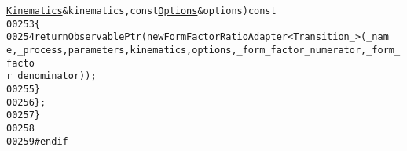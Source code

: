 \begin{footnotesize}
\begin{alltt}
      \hyperlink{classeos_1_1Kinematics}{Kinematics} & kinematics, \textcolor{keyword}{const} \hyperlink{classeos_1_1Options}{Options} & options)\textcolor{keyword}{ const}
00253 \textcolor{keyword}{            }\{
00254                 \textcolor{keywordflow}{return} \hyperlink{namespaceeos_a470e5dd806bd129080f1aa0c2954646f}{ObservablePtr}(\textcolor{keyword}{new} \hyperlink{classeos_1_1FormFactorRatioAdapter}{FormFactorRatioAdapter<Transition_>}(\_nam
      e, \_process, parameters, kinematics, options, \_form\_factor\_numerator, \_form\_facto
      r\_denominator));
00255             \}
00256     \};
00257 \}
00258 
00259 \textcolor{preprocessor}{#endif}
\end{alltt}\end{footnotesize}
